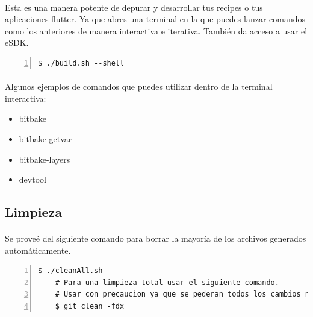 \paragraph{}Esta es una manera potente de depurar y desarrollar tus recipes o tus
aplicaciones flutter. Ya que abres una terminal en la que puedes lanzar comandos como
los anteriores de manera interactiva e iterativa. También da acceso a usar el \gls{eSDK}.

\begin{lstlisting}[style=consola, numbers=left]
    $ ./build.sh --shell
\end{lstlisting}

\paragraph{}Algunos ejemplos de comandos que puedes utilizar dentro de la terminal interactiva:

\begin{itemize}
    \item bitbake
    \item bitbake-getvar
    \item bitbake-layers
    \item devtool
\end{itemize}

\subsection{Limpieza}

\paragraph{}Se proveé del siguiente comando para borrar la mayoría de los archivos generados
automáticamente.

\begin{lstlisting}[style=consola, numbers=left]
    $ ./cleanAll.sh
    # Para una limpieza total usar el siguiente comando.
    # Usar con precaucion ya que se pederan todos los cambios no guardados en git.
    $ git clean -fdx
\end{lstlisting}


